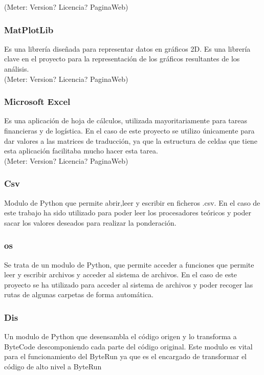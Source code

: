 (Meter: Version? Licencia? PaginaWeb)


\subsubsection{MatPlotLib}

Es una librería diseñada para representar datos en gráficos 2D. Es una librería clave en el proyecto para la representación de los gráficos resultantes de los análisis.\\

(Meter: Version? Licencia? PaginaWeb)


\subsubsection{Microsoft Excel}
Es una aplicación de hoja de cálculos, utilizada mayoritariamente para tareas financieras y de logística. En el caso de este proyecto se utilizo únicamente para dar valores a las matrices de traducción, ya que la estructura de celdas que tiene esta aplicación facilitaba mucho hacer esta tarea.\\

(Meter: Version? Licencia? PaginaWeb)

\subsubsection{Csv}

Modulo de Python que permite abrir,leer y escribir en ficheros .csv. En el caso de este trabajo ha sido utilizado para poder leer los procesadores teóricos y poder sacar los valores deseados para realizar la ponderación.
 
\subsubsection{os}
Se trata de un modulo de Python, que permite acceder a funciones que permite leer y escribir archivos y acceder al sistema de archivos. En el caso de este proyecto se ha utilizado para acceder al sistema de archivos y poder recoger las rutas de algunas carpetas de forma automática. 

\subsubsection{Dis}
Un modulo de Python que desensambla el código origen y lo transforma a ByteCode descomponiendo cada parte del código original. Este modulo es vital para el funcionamiento del ByteRun ya que es el encargado de transformar el código de alto nivel a ByteRun


